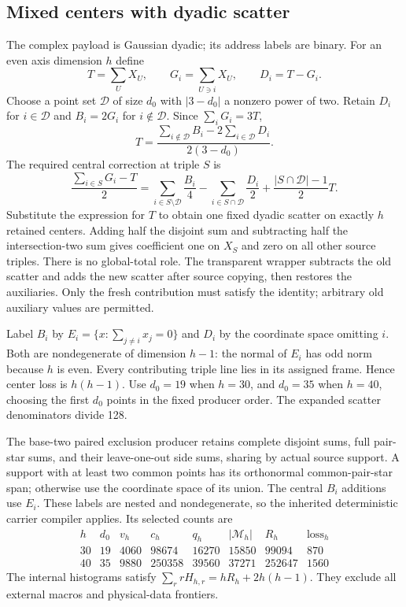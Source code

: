 \subsection{Mixed centers with dyadic scatter}
The complex payload is Gaussian dyadic; its address labels are binary.
For an even axis dimension $h$ define
\[
 T=\sum_U X_U,\qquad G_i=\sum_{U\ni i}X_U,\qquad D_i=T-G_i.
\]
Choose a point set $\mathcal D$ of size $d_0$ with $|3-d_0|$ a
nonzero power of two. Retain $D_i$ for $i\in\mathcal D$ and
$B_i=2G_i$ for $i\notin\mathcal D$. Since $\sum_iG_i=3T$,
\[
 T=\frac{\sum_{i\notin\mathcal D}B_i-2\sum_{i\in\mathcal D}D_i}
          {2(3-d_0)}.
\]
The required central correction at triple $S$ is
\[
 \frac{\sum_{i\in S}G_i-T}{2}
 =\sum_{i\in S\setminus\mathcal D}\frac{B_i}{4}
  -\sum_{i\in S\cap\mathcal D}\frac{D_i}{2}
  +\frac{|S\cap\mathcal D|-1}{2}T.
\]
Substitute the expression for $T$ to obtain one fixed dyadic scatter
on exactly $h$ retained centers. Adding half the disjoint sum and
subtracting half the intersection-two sum gives coefficient one on
$X_S$ and zero on all other source triples. There is no global-total
role. The transparent wrapper subtracts the old scatter and adds the
new scatter after source copying, then restores the auxiliaries.
Only the fresh contribution must satisfy the identity; arbitrary old
auxiliary values are permitted.

Label $B_i$ by $E_i=\{x:\sum_{j\ne i}x_j=0\}$ and $D_i$ by the
coordinate space omitting $i$. Both are nondegenerate of dimension
$h-1$: the normal of $E_i$ has odd norm because $h$ is even.
Every contributing triple line lies in its assigned frame.
Hence center loss is $h(h-1)$. Use $d_0=19$ when $h=30$, and
$d_0=35$ when $h=40$, choosing the first $d_0$ points in the fixed
producer order. The expanded scatter denominators divide 128.

The base-two paired exclusion producer retains complete disjoint sums,
full pair-star sums, and their leave-one-out side sums, sharing by
actual source support. A support with at least two common points has
its orthonormal common-pair-star span; otherwise use the coordinate
space of its union. The central $B_i$ additions use $E_i$. These
labels are nested and nondegenerate, so the inherited deterministic
carrier compiler applies. Its selected counts are
\[
\begin{array}{c|rrrrrrr}
h&d_0&v_h&c_h&q_h&|\mathcal M_h|&R_h&\text{loss}_h\\\hline
30&19&4060&98674&16270&15850&99094&870\\
40&35&9880&250358&39560&37271&252647&1560
\end{array}
\]
The internal histograms satisfy $\sum_r rH_{h,r}=hR_h+2h(h-1)$.
They exclude all external macros and physical-data frontiers.

